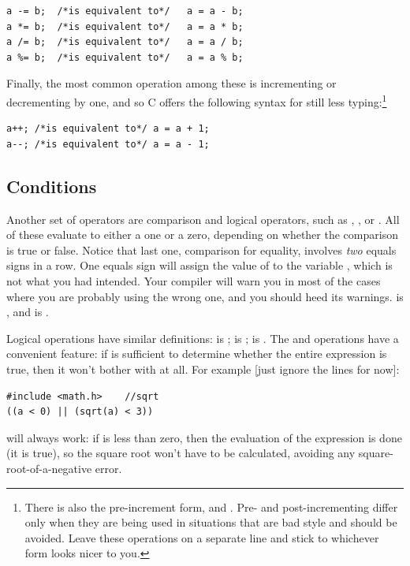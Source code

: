 \begin{lstlisting}
a -= b;  /*is equivalent to*/   a = a - b;
a *= b;  /*is equivalent to*/   a = a * b;
a /= b;  /*is equivalent to*/   a = a / b;
a %= b;  /*is equivalent to*/   a = a % b;
\end{lstlisting}

Finally, the most common operation among these is incrementing or decrementing by one, and so C offers the
following syntax for still less typing:\footnote{There is also the pre-increment form,  and
. Pre- and post-incrementing differ only when they are being used in situations that are bad style and should
be avoided. Leave these operations on a separate line and stick to whichever form looks nicer to you.} \\
\begin{lstlisting}
a++; /*is equivalent to*/ a = a + 1;
a--; /*is equivalent to*/ a = a - 1;
\end{lstlisting}



\subsection{Conditions} 	
\label{forloops}    
\ckeyind{<} \ckeyind{>} \ckeyind{==}
Another set of operators are comparison and logical operators, such as ,
, or . All of these evaluate to either a one or a zero, depending on whether the
comparison is true or false. Notice that last one, comparison for equality, involves {\sl two} equals
signs in a row. One equals sign  will assign the value of  to the variable , which is not what
you had intended. Your compiler will warn you in most of the cases where you are
probably using the wrong one, and you should heed its warnings.  is , and  is .

\ckeyind{\&\&}  
Logical operations have similar definitions: \cindex{\&\&}  
  
 is ;  is ;  is .
The \ci{\&\&} and \ci{||} operations have a convenient feature: if  is sufficient to determine whether
the entire expression is true, then it won't bother with  at all. For example [just ignore the  lines for now]:
\begin{lstlisting}
#include <math.h>    //sqrt
((a < 0) || (sqrt(a) < 3))
\end{lstlisting}
will always work: if  is less than zero, then the evaluation
of the expression is done (it is true), so the square root won't have
to be calculated, avoiding any square-root-of-a-negative error. 

